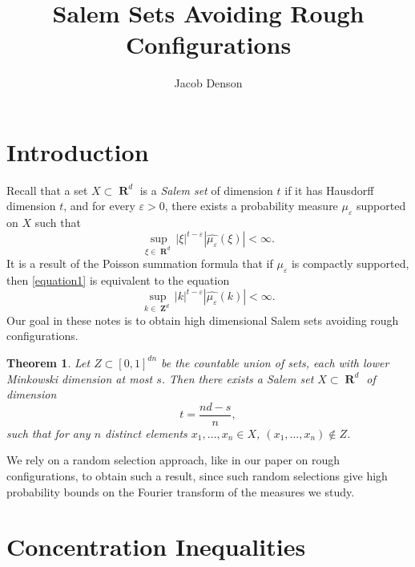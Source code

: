 \documentclass[12pt,reqno]{article}
\title{Salem Sets Avoiding Rough Configurations}
\author{Jacob Denson}
\numberwithin{equation}{section}
\DeclareMathOperator{\RR}{\mathbf{R}}
\DeclareMathOperator{\ZZ}{\mathbf{Z}}
\newtheorem{theorem}{Theorem}
\begin{document}
\maketitle

\section{Introduction}

Recall that a set $X \subset \RR^d$ is a \emph{Salem set} of dimension $t$ if it has Hausdorff dimension $t$, and for every $\varepsilon > 0$, there exists a probability measure $\mu_\varepsilon$ supported on $X$ such that
%
\begin{equation} \label{equation1}
    \sup_{\xi \in \RR^d} |\xi|^{t - \varepsilon} |\widehat{\mu_\varepsilon}(\xi)| < \infty.
\end{equation}
%
It is a result of the Poisson summation formula that if $\mu_\varepsilon$ is compactly supported, then \eqref{equation1} is equivalent to the equation
%
\begin{equation}
    \sup_{k \in \ZZ^d} |k|^{t - \varepsilon} |\widehat{\mu_\varepsilon}(k)| < \infty.
\end{equation}
%
Our goal in these notes is to obtain high dimensional Salem sets avoiding rough configurations.

\begin{theorem} \label{maintheorem}
    Let $Z \subset [0,1]^{dn}$ be the countable union of sets, each with lower Minkowski dimension at most $s$. Then there exists a Salem set $X \subset \RR^d$ of dimension
    \[ t = \frac{nd - s}{n}, \]
    such that for any $n$ distinct elements $x_1, \dots, x_n \in X$, $(x_1, \dots, x_n) \not \in Z$.
\end{theorem}

We rely on a random selection approach, like in our paper on rough configurations, to obtain such a result, since such random selections give high probability bounds on the Fourier transform of the measures we study.

\section{Concentration Inequalities}
\end{document}
